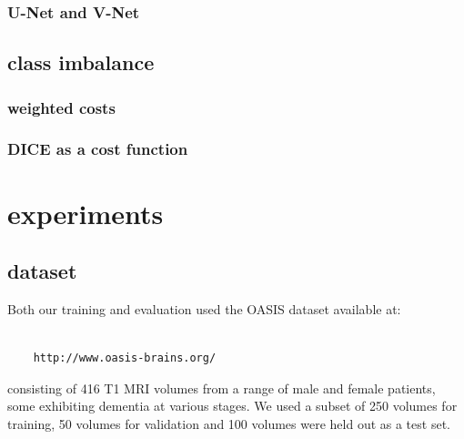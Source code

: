 \documentclass[msc]{infthesis}
\begin{document}
\subsection{U-Net and V-Net}
\label{sec:segmentation-3-5}




\section{class imbalance}
\label{sec:segmentation-4}


\subsection{weighted costs}
\label{sec:segmentation-4-1}


\subsection{DICE as a cost function}
\label{sec:segmentation-4-2}




\chapter{experiments}
\label{sec:experiments}




\section{dataset}

Both our training and evaluation used the OASIS dataset available at:
\begin{verbatim}

    http://www.oasis-brains.org/

\end{verbatim}
consisting of 416 T1 MRI volumes from a range of male and female patients, some exhibiting dementia at
various stages.  We used a subset of 250 volumes for training, 50 volumes for validation and 100 volumes
were held out as a test set.
\end{document}
